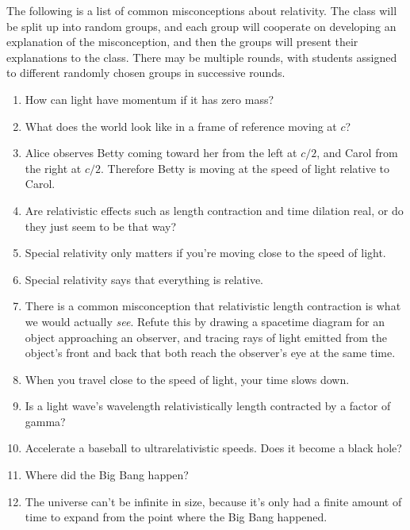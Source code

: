 The following is a list of common misconceptions about relativity. The class
will be split up into random groups, and each group will cooperate on developing
an explanation of the misconception, and then the groups will present their explanations
to the class. There may be multiple rounds, with students assigned to different
randomly chosen groups in successive rounds.

\begin{enumerate}

\item
  How can light have momentum if it has zero mass?

\item
  What does the world look like in a frame of reference moving at $c$?

\item
  Alice observes Betty coming toward her from the left at $c/2$, and  
  Carol from the right at $c/2$. Therefore Betty is moving at the speed
  of light relative to Carol.

\item
  Are relativistic effects such as length contraction and time
  dilation real, or do they just seem to be that way?

\item
  Special relativity only matters if you're moving close to the
  speed of light.

\item
  Special relativity says that everything is relative.

\item
  There is a common misconception that relativistic length contraction
  is what we would actually \emph{see}. Refute this by drawing a spacetime
  diagram for an object approaching an observer, and tracing rays of
  light emitted from the object's front and back that both reach the
  observer's eye at the same time.

\item
  When you travel close to the speed of light, your time slows down.

\item
  Is a light wave's wavelength relativistically length contracted by
  a factor of gamma?

\item
  Accelerate a baseball to ultrarelativistic speeds. Does it become a
  black hole?

\item
  Where did the Big Bang happen?

\item
  The universe can't be infinite in size, because it's only had a
  finite amount of time to expand from the point where the Big Bang
  happened.

\end{enumerate}
